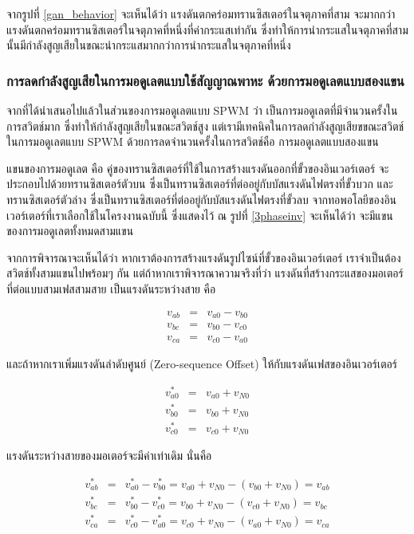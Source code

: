 \documentclass[11pt,a4paper]{article}
\begin{document}
จากรูปที่ \ref{gan_behavior} จะเห็นได้ว่า แรงดันตกคร่อมทรานซิสเตอร์ในจตุภาคที่สาม จะมากกว่าแรงดันตกคร่อมทรานซิสเตอร์ในจตุภาคที่หนึ่งที่ค่ากระแสเท่ากัน ซึ่งทำให้การนำกระแสในจตุภาคที่สามนั้นมีกำลังสูญเสียในขณะนำกระแสมากกว่าการนำกระแสในจตุภาคที่หนึ่ง

\subsubsection{การลดกำลังสูญเสียในการมอดูเลตแบบใช้สัญญาณพาหะ ด้วยการมอดูเลตแบบสองแขน}

จากที่ได้นำเสนอไปแล้วในส่วนของการมอดูเลตแบบ SPWM ว่า เป็นการมอดูเลตที่มีจำนวนครั้งในการสวิตช์มาก ซึ่งทำให้กำลังสูญเสียในขณะสวิตช์สูง แต่เรามีเทคนิคในการลดกำลังสูญเสียขขณะสวิตช์ในการมอดูเลตแบบ SPWM ด้วยการลดจำนวนครั้งในการสวิตช์คือ การมอดูเลตแบบสองแขน

แขนของการมอดูเลต คือ คู่ของทรานซิสเตอร์ที่ใช้ในการสร้างแรงดันออกที่ขั้วของอินเวอร์เตอร์ จะประกอบไปด้วยทรานซิสเตอร์ตัวบน ซึ่งเป็นทรานซิสเตอร์ที่ต่ออยู่กับบัสแรงดันไฟตรงที่ขั้วบวก และทรานซิสเตอร์ตัวล่าง ซึ่งเป็นทรานซิสเตอร์ที่ต่ออยู่กับบัสแรงดันไฟตรงที่ขั้วลบ จากทอพอโลยีของอินเวอร์เตอร์ที่เราเลือกใช้ในโครงงานฉบับนี้ ซึ่งแสดงไว้ ณ รูปที่ \ref{3phaseinv} จะเห็นได้ว่า จะมีแขนของการมอดูเลตทั้งหมดสามแขน

จากการพิจารณาจะเห็นได้ว่า หากเราต้องการสร้างแรงดันรูปไซน์ที่ขั้วของอินเวอร์เตอร์ เราจำเป็นต้องสวิตช์ทั้งสามแขนไปพร้อมๆ กัน แต่ถ้าหากเราพิจารณาความจริงที่ว่า แรงดันที่สร้างกระแสของมอเตอร์ที่ต่อแบบสามเฟสสามสาย เป็นแรงดันระหว่างสาย คือ

\begin{eqnarray}
    v_{ab} &=& v_{a0} - v_{b0} \\
    v_{bc} &=& v_{b0} - v_{c0} \\
    v_{ca} &=& v_{c0} - v_{a0}
\end{eqnarray}

และถ้าหากเราเพิ่มแรงดันลำดับศูนย์ (Zero-sequence Offset) ให้กับแรงดันเฟสของอินเวอร์เตอร์

\begin{eqnarray}
    v_{a0}^* &=& v_{a0} + v_{N0} \\
    v_{b0}^* &=& v_{b0} + v_{N0} \\
    v_{c0}^* &=& v_{c0} + v_{N0}
\end{eqnarray}

แรงดันระหว่างสายของมอเตอร์จะมีค่าเท่าเดิม นั่นคือ

\begin{eqnarray}
    v_{ab}^* &=& v_{a0}^* - v_{b0}^* = v_{a0} + v_{N0} - (v_{b0} + v_{N0}) = v_{ab} \\
    v_{bc}^* &=& v_{b0}^* - v_{c0}^* = v_{b0} + v_{N0} - (v_{c0} + v_{N0}) = v_{bc} \\
    v_{ca}^* &=& v_{c0}^* - v_{a0}^* = v_{c0} + v_{N0} - (v_{a0} + v_{N0}) = v_{ca}
\end{eqnarray}
\end{document}
